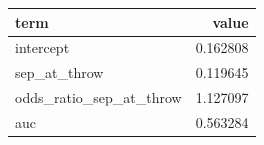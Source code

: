 \begin{tabular}{lr}
\toprule
term & value \\
\midrule
intercept & 0.162808 \\
sep\_at\_throw & 0.119645 \\
odds\_ratio\_sep\_at\_throw & 1.127097 \\
auc & 0.563284 \\
\bottomrule
\end{tabular}
